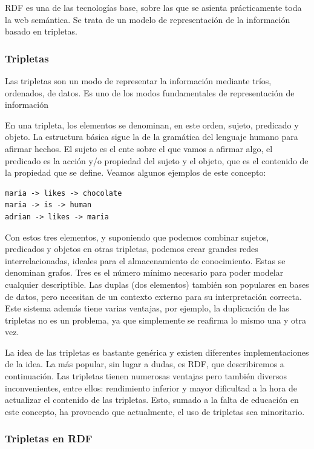 \documentclass[12pt]{report} %
\begin{document}
RDF es una de las tecnologías base, sobre las que se asienta prácticamente toda la web semántica. Se trata de un modelo de representación de la información basado en tripletas.

\subsubsection{Tripletas}
Las tripletas son un modo de representar la información mediante tríos, ordenados, de datos.
Es uno de los modos fundamentales de representación de información

En una tripleta, los elementos se denominan, en este orden, sujeto, predicado y objeto. La estructura básica sigue la de la gramática del lenguaje humano para afirmar hechos.
El sujeto es el ente sobre el que vamos a afirmar algo, el predicado es la acción y/o propiedad del sujeto y el objeto, que es el contenido de la propiedad que se define.
Veamos algunos ejemplos de este concepto:
\begin{verbatim}
maria -> likes -> chocolate
maria -> is -> human
adrian -> likes -> maria
\end{verbatim}
Con estos tres elementos, y suponiendo que podemos combinar sujetos, predicados y objetos en otras tripletas, podemos crear grandes redes interrelacionadas, ideales para el almacenamiento de conocimiento.
Estas se denominan grafos.
Tres es el número mínimo necesario para poder modelar cualquier descriptible. Las duplas (dos elementos) también son populares en bases de datos, pero necesitan de un contexto externo para su interpretación correcta.
Este sistema además tiene varias ventajas, por ejemplo, la duplicación de las tripletas no es un problema, ya que simplemente se reafirma lo mismo una y otra vez.

La idea de las tripletas es bastante genérica y existen diferentes implementaciones de la idea. La más popular, sin lugar a dudas, es RDF, que describiremos a continuación.
Las tripletas tienen numerosas ventajas pero también diversos inconvenientes, entre ellos: rendimiento inferior y mayor dificultad a la hora de actualizar el contenido de las tripletas.
Esto, sumado a la falta de educación en este concepto, ha provocado que actualmente, el uso de tripletas sea minoritario.

\subsubsection{Tripletas en RDF}
\end{document}
